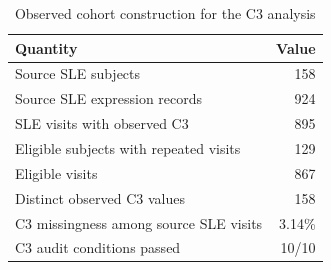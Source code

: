 \begin{table}[t]
\caption{Observed cohort construction for the C3 analysis}\label{tab:data-audit}
\begin{tabularx}{\textwidth}{@{}Xr@{}}
\toprule
Quantity & Value \\
\midrule
Source SLE subjects & 158 \\
Source SLE expression records & 924 \\
SLE visits with observed C3 & 895 \\
Eligible subjects with repeated visits & 129 \\
Eligible visits & 867 \\
Distinct observed C3 values & 158 \\
C3 missingness among source SLE visits & 3.14\% \\
C3 audit conditions passed & 10/10 \\
\bottomrule
\end{tabularx}
\end{table}
